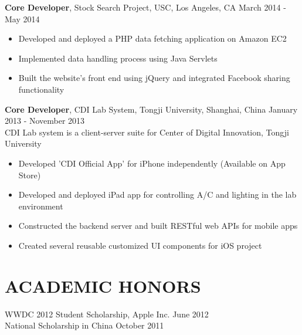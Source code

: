 \documentclass[line, overlapped]{res}
\begin{document}
\begin{resume}
\begin{itemize}
 \end{itemize}
 
 \textbf{Core Developer}, Stock Search Project, USC, Los Angeles, CA \hfill  March 2014 - May 2014
\begin{itemize} \itemsep -2pt %
	
  \item Developed and deployed a PHP data fetching application on Amazon EC2

  \item Implemented data handling process using Java Servlets
  
  \item Built the website's front end using jQuery and integrated Facebook sharing functionality

\end{itemize}

\textbf{Core Developer}, CDI Lab System, Tongji University, Shanghai, China \hfill January 2013 - November 2013\\
CDI Lab system is a client-server suite for Center of Digital Innovation, Tongji University
\begin{itemize} \itemsep -2pt %

  \item Developed 'CDI Official App' for iPhone independently (Available on App Store)
  
  \item Developed and deployed iPad app for controlling A/C and lighting in the lab environment
  
  \item Constructed the backend server and built RESTful web APIs for mobile apps

  \item Created several reusable customized UI components for iOS project

\end{itemize}

\section{ACADEMIC HONORS}
WWDC 2012 Student Scholarship, Apple Inc. \hfill June 2012\\
National Scholarship in China \hfill October 2011\\

\end{resume}
\end{document}

